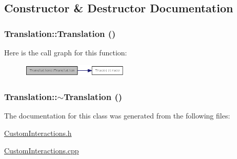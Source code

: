 \subsection{Constructor \& Destructor Documentation}
\hypertarget{classTranslation_a19a6742a807888b66b0a402469bbf588}{
\subsubsection[{Translation}]{\setlength{\rightskip}{0pt plus 5cm}Translation::Translation ()}}
\label{classTranslation_a19a6742a807888b66b0a402469bbf588}


Here is the call graph for this function:\nopagebreak
\begin{figure}[H]
\begin{center}
\leavevmode
\includegraphics[width=146pt]{classTranslation_a19a6742a807888b66b0a402469bbf588_cgraph}
\end{center}
\end{figure}
\hypertarget{classTranslation_ab6843356b4ba3234408b6a6024f0a5f1}{
\subsubsection[{$\sim$Translation}]{\setlength{\rightskip}{0pt plus 5cm}Translation::$\sim$Translation ()}}
\label{classTranslation_ab6843356b4ba3234408b6a6024f0a5f1}


The documentation for this class was generated from the following files:\begin{DoxyCompactItemize}
\item 
\hyperlink{CustomInteractions_8h}{CustomInteractions.h}\item 
\hyperlink{CustomInteractions_8cpp}{CustomInteractions.cpp}\end{DoxyCompactItemize}
